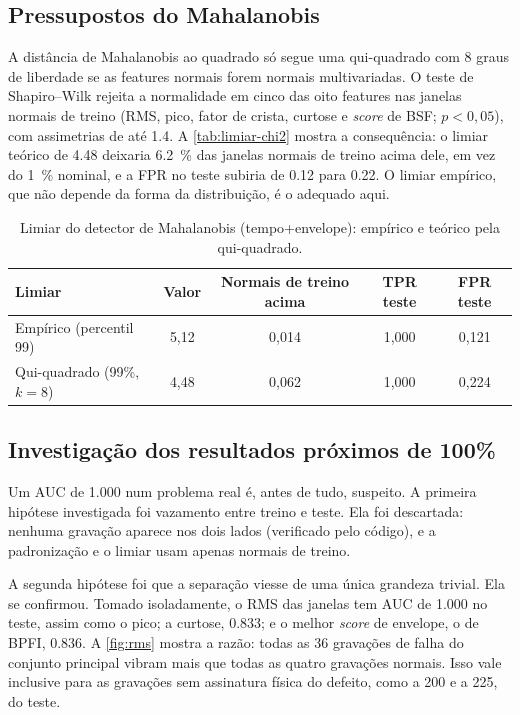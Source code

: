\subsection{Pressupostos do Mahalanobis}
\label{sec:res-pressupostos}

A distância de Mahalanobis ao quadrado
só segue uma qui-quadrado com 8 graus de liberdade se as features normais forem
normais multivariadas. O teste de Shapiro--Wilk rejeita a normalidade em cinco
das oito features nas janelas normais de treino (RMS, pico, fator de crista,
curtose e \emph{score} de BSF; $p < 0{,}05$), com assimetrias de até \num{1.4}. A
\autoref{tab:limiar-chi2} mostra a consequência: o limiar teórico de
\num{4.48} deixaria \SI{6.2}{\percent} das janelas normais de treino acima dele,
em vez do \SI{1}{\percent} nominal, e a FPR no teste subiria de \num{0.12} para
\num{0.22}. O limiar empírico, que não depende da forma da distribuição, é o
adequado aqui.

\begin{table}[htb]
  \centering
  \caption{Limiar do detector de Mahalanobis (tempo+envelope): empírico e
  teórico pela qui-quadrado.}
  \label{tab:limiar-chi2}
  \footnotesize
  \begin{tabular}{lcccc}
    \toprule
    \textbf{Limiar} & \textbf{Valor} & \textbf{Normais de treino acima} &
    \textbf{TPR teste} & \textbf{FPR teste} \\
    \midrule
    Empírico (percentil 99)        & 5,12 & 0,014 & 1,000 & 0,121 \\
    Qui-quadrado (99\%, $k = 8$)   & 4,48 & 0,062 & 1,000 & 0,224 \\
    \bottomrule
  \end{tabular}
\end{table}

\subsection{Investigação dos resultados próximos de 100\%}
\label{sec:investigacao-amplitude}

Um AUC de \num{1.000} num problema real é, antes de tudo, suspeito. A primeira
hipótese investigada foi vazamento entre treino e teste. Ela foi descartada:
nenhuma gravação aparece nos dois lados (verificado pelo código), e a
padronização e o limiar usam apenas normais de treino.

A segunda hipótese foi que a separação viesse de uma única grandeza trivial. Ela
se confirmou. Tomado isoladamente, o RMS das janelas tem AUC de \num{1.000} no
teste, assim como o pico; a curtose, \num{0.833}; e o melhor \emph{score} de envelope,
o de BPFI, \num{0.836}. A \autoref{fig:rms} mostra a razão: todas as 36 gravações
de falha do conjunto principal vibram mais que todas as quatro gravações normais.
Isso vale inclusive para as gravações sem assinatura física do defeito, como a
200 e a 225, do teste.

